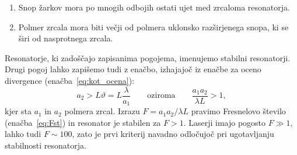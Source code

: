 \begin{enumerate} 
\item Snop žarkov mora po mnogih odbojih ostati ujet med zrcaloma resonatorja.
\item Polmer zrcala mora biti večji od polmera uklonsko razširjenega snopa, ki se širi od nasprotnega zrcala. 
\end{enumerate}

Resonatorje, ki zadoščajo zapisanima pogojema, imenujemo stabilni 
resonatorji.
Drugi pogoj lahko zapišemo tudi z enačbo, izhajajoč iz enačbe za oceno divergence (enačba~\ref{eq:kot_ocena}):
\begin{equation}
a_2 > L \vartheta = L\frac{\lambda}{a_1}\qquad \mathrm{oziroma} \qquad
\frac{a_{1}a_{2}}{\lambda L}>1,
\label{eq:Fresnelovo_stevilo}
\end{equation}
kjer sta $a_{1}$ in $a_{2}$ polmera zrcal. Izrazu 
$
F = a_{1}a_{2}/\lambda L
$
pravimo Fresnelovo število (enačba~\ref{eq:Fst})
in resonator je stabilen za $F>1$. Laserji imajo pogosto $F\gg 1$, lahko tudi $F \sim 100$, zato je 
prvi kriterij navadno odločujoč pri ugotavljanju stabilnosti resonatorja.

